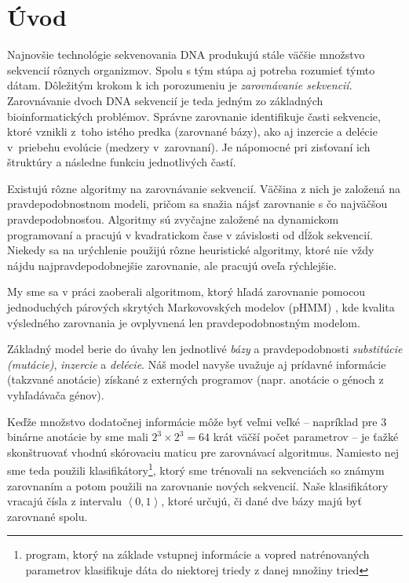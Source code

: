 \chapter*{Úvod}
{}

Najnovšie technológie sekvenovania DNA produkujú stále väčšie množstvo sekvencií rôznych organizmov. Spolu s tým stúpa aj potreba rozumieť týmto dátam.
Dôležitým krokom k ich porozumeniu je \textit{zarovnávanie sekvencií}.
Zarovnávanie dvoch DNA sekvencií je teda jedným zo základných
bioinformatických problémov. Správne zarovnanie identifikuje časti
sekvencie, ktoré vznikli z~toho istého predka (zarovnané bázy), ako aj
inzercie a delécie v~priebehu evolúcie (medzery v~zarovnaní).
Je nápomocné pri zisťovaní ich štruktúry a následne funkciu jednotlivých častí.

Existujú rôzne algoritmy na zarovnávanie sekvencií. Väčšina z nich je založená na  pravdepodobnostnom modeli, pričom sa snažia nájsť zarovnanie s čo najväčšou pravdepodobnosťou.
Algoritmy sú zvyčajne založené na dynamickom programovaní a pracujú v kvadratickom čase v závislosti od dĺžok sekvencií. Niekedy sa na urýchlenie použijú rôzne heuristické algoritmy, ktoré nie vždy nájdu najpravdepodobnejšie zarovnanie, ale pracujú oveľa rýchlejšie.

My sme sa v práci zaoberali algoritmom, ktorý hľadá zarovnanie pomocou jednoduchých párových skrytých
Markovovských modelov (pHMM) \cite{durbin}, kde kvalita výsledného zarovnania je ovplyvnená len pravdepodobnostným modelom.

Základný model berie do úvahy len jednotlivé \textit{bázy} a pravdepodobnosti \textit{substitúcie (mutácie)}, \textit{inzercie} a \textit{delécie}.
Náš model navyše uvažuje aj prídavné informácie (takzvané anotácie) získané z externých programov (napr. anotácie o génoch z vyhľadávača génov).

Keďže množstvo dodatočnej informácie môže byť veľmi veľké -- napríklad pre 3 binárne anotácie by sme mali $2^3 \times 2^3 = 64$ krát väčší počet parametrov --
je ťažké skonštruovať vhodnú skórovaciu maticu pre zarovnávací algoritmus.
Namiesto nej sme teda použili klasifikátory\footnote{program, ktorý na základe vstupnej informácie a vopred natrénovaných parametrov klasifikuje dáta do niektorej triedy z danej množiny tried}, ktorý  sme trénovali na sekvenciách so známym zarovnaním a potom použili na zarovnanie nových sekvencií. Naše klasifikátory vracajú čísla z intervalu $\left<0, 1\right>$, ktoré určujú, či dané dve bázy majú byť zarovnané spolu.

